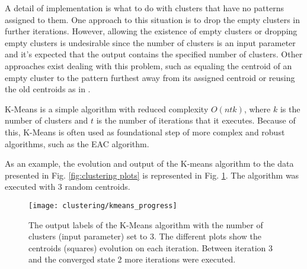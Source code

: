 A detail of implementation is what to do with clusters that have no patterns assigned to them.
One approach to this situation is to drop the empty clusters in further iterations.
However, allowing the existence of empty clusters or dropping empty clusters is undesirable since the number of clusters is an input parameter and it's expected that the output contains the specified number of clusters.
Other approaches exist dealing with this problem, such as equaling the centroid of an empty cluster to the pattern furthest away from its assigned centroid or reusing the old centroids as in \cite{Pakhira2009}.

K-Means is a simple algorithm with reduced complexity $O(ntk)$, where $k$ is the number of clusters and $t$ is the number of iterations that it executes.
Because of this, K-Means is often used as foundational step of more complex and robust algorithms, such as the EAC algorithm.




As an example, the evolution and output of the K-means algorithm to the data presented in Fig. \ref{fig:clustering plots} is represented in Fig. \ref{fig:intro kmeans}.
The algorithm was executed with 3 random centroids.

\begin{figure}[hbtp]
    \centering
    \texttt{[image: clustering/kmeans\_progress]}
    \caption{The output labels of the K-Means algorithm with the number of clusters (input parameter) set to 3. The different plots show the centroids (squares) evolution on each iteration. Between iteration 3 and the converged state 2 more iterations were executed.}
    \label{fig:intro kmeans}
\end{figure}

